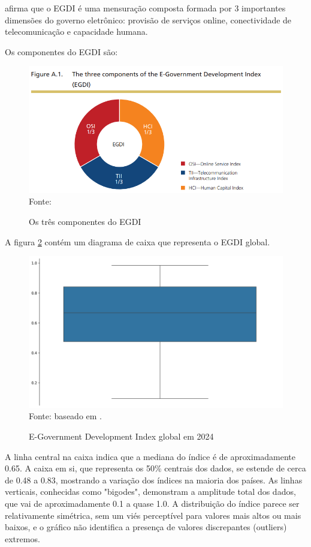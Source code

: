 \cite{ONU_EGDI} afirma que o EGDI é uma mensuração composta formada por 3 importantes dimensões do governo eletrônico: provisão de serviços online, conectividade de telecomunicação e capacidade humana.

Os componentes do EGDI são:

\begin{figure}[H]
	\centering
	\caption{Os três componentes do EGDI}
	\includegraphics[width=1\linewidth]{figuras/egdi/egdi_componentes.png}
	\label{fig:egdi_componentes}
	\footnotesize{Fonte: \cite{ONU_EGDI_methodology}}
\end{figure}

A figura \ref{fig:boxplot_egov_global} contém um diagrama de caixa que representa o EGDI global.

\begin{figure}[H]
	\centering
	\caption{E-Government Development Index global em 2024}
	\includegraphics[width=1\linewidth]{figuras/egdi/boxplot_egov_global.png}
	\label{fig:boxplot_egov_global}
	\footnotesize{Fonte: baseado em \cite{ONU_EGDI_mapa}.}
\end{figure}

A linha central na caixa indica que a mediana do índice é de aproximadamente 0.65. A caixa em si, que representa os 50\% centrais dos dados, se estende de cerca de 0.48 a 0.83, mostrando a variação dos índices na maioria dos países. As linhas verticais, conhecidas como "bigodes", demonstram a amplitude total dos dados, que vai de aproximadamente 0.1 a quase 1.0. A distribuição do índice parece ser relativamente simétrica, sem um viés perceptível para valores mais altos ou mais baixos, e o gráfico não identifica a presença de valores discrepantes (outliers) extremos.


